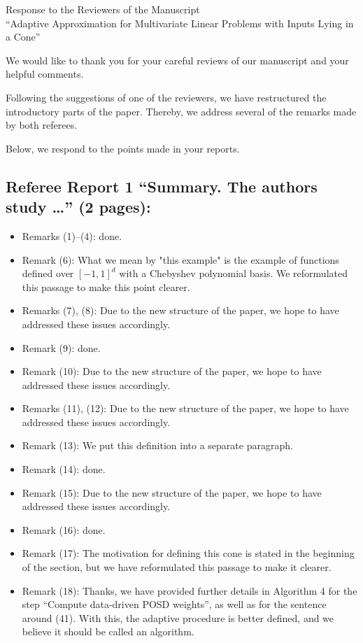 \documentclass[11pt]{article}
\begin{document}
\begin{center}
 
{\Large Response to the Reviewers of the Manuscript\\
``Adaptive Approximation for Multivariate Linear Problems with Inputs Lying in a Cone''}
\end{center}

\medskip

\noindent We would like to thank you for your careful reviews of our manuscript and your helpful comments. 

Following the suggestions of one of the reviewers, we have restructured the introductory parts of the paper. Thereby, we address several of the remarks 
made by both referees. 

Below, we respond to the points made in your reports.

\subsection*{Referee Report 1 ``Summary. The authors study \ldots '' (2 pages):}

\begin{itemize}
\item Remarks (1)--(4): done. 
\item Remark (6): What we mean by "this example" is the example of functions defined over $[-1,1]^d$ with a Chebyshev polynomial basis. We reformulated this passage to make this point clearer. 
\item Remarks (7), (8): Due to the new structure of the paper, we hope to have addressed these issues accordingly. 
\item Remark (9): done. 
\item Remark (10): Due to the new structure of the paper, we hope to have addressed these issues accordingly. 
\item Remarks (11), (12): Due to the new structure of the paper, we hope to have addressed these issues accordingly. 
\item Remark (13): We put this definition into a separate paragraph. 
\item Remark (14): done. 
\item Remark (15): Due to the new structure of the paper, we hope to have addressed these issues accordingly. 
\item Remark (16): done. 
\item Remark (17): The motivation for defining this cone is stated in the beginning of the section, but we have reformulated this passage to make it clearer. 
\item Remark (18): Thanks, we have provided further details in Algorithm 4 for the step ``Compute data-driven POSD weights'', as well as for the sentence around (41). With this, the adaptive procedure is better defined, and we believe it should be called an algorithm.
\end{itemize}
\end{document}
